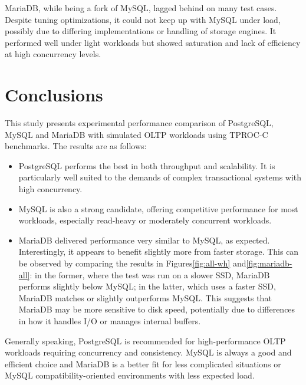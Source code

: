 MariaDB, while being a fork of MySQL, lagged behind on many test cases. Despite tuning optimizations, it could not keep up with MySQL under load, possibly due to differing implementations or handling of storage engines. It performed well under light workloads but showed saturation and lack of efficiency at high concurrency levels.

\section{Conclusions}
\label{sec:conclusions}

This study presents experimental performance comparison of PostgreSQL, MySQL and MariaDB with simulated OLTP workloads using TPROC-C benchmarks. The results are as follows:

\begin{itemize}
    \setlength\itemsep{0.1em}
    \item PostgreSQL performs the best in both throughput and scalability. It is particularly well suited to the demands of complex transactional systems with high concurrency.
    \item MySQL is also a strong candidate, offering competitive performance for most workloads, especially read-heavy or moderately concurrent workloads. 
    \item MariaDB delivered performance very similar to MySQL, as expected. Interestingly, it appears to benefit slightly more from faster storage. This can be observed by comparing the results in Figures\ref{fig:all-wh} and\ref{fig:mariadb-all}: in the former, where the test was run on a slower SSD, MariaDB performs slightly below MySQL; in the latter, which uses a faster SSD, MariaDB matches or slightly outperforms MySQL. This suggests that MariaDB may be more sensitive to disk speed, potentially due to differences in how it handles I/O or manages internal buffers.
\end{itemize}

Generally speaking, PostgreSQL is recommended for high-performance OLTP workloads requiring concurrency and consistency. MySQL is always a good and efficient choice and MariaDB is a better fit for less complicated situations or MySQL compatibility-oriented environments with less expected load.
